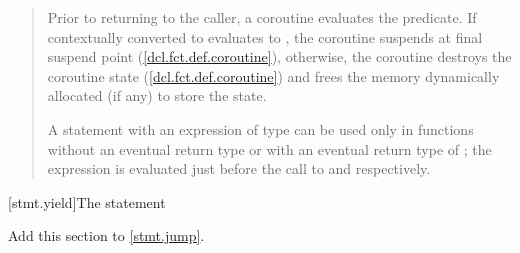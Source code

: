 \begin{quote}

\pnum
Prior to returning to the caller, a coroutine evaluates
the  predicate. If  contextually converted to  evaluates to
, the coroutine suspends at final suspend point (\ref{dcl.fct.def.coroutine}),
otherwise, the coroutine destroys the coroutine state (\ref{dcl.fct.def.coroutine}) and frees the memory dynamically allocated (if any) to store the state.

\pnum
A  statement with an expression of type \cvvoid
can be used only in functions without an eventual return type 
or with an eventual return type of ; the expression is evaluated just before the call to  and  respectively.


%

\end{quote}

[stmt.yield]{The  statement}%

Add this section to \ref{stmt.jump}.


